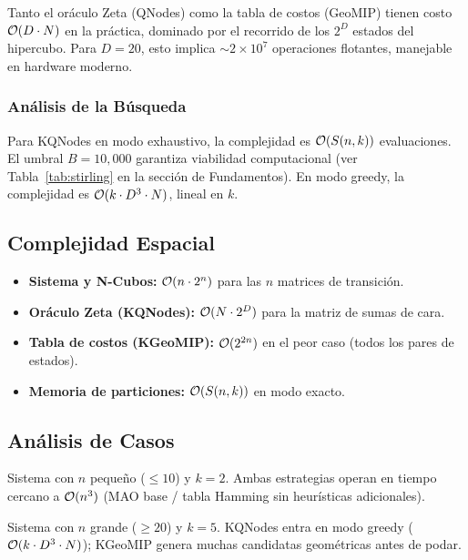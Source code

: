 Tanto el oráculo Zeta (QNodes) como la tabla de costos (GeoMIP) tienen costo $\mathcal{O}(D \cdot N)$ en la práctica, dominado por el recorrido de los $2^D$ estados del hipercubo. Para $D = 20$, esto implica $\sim 2\times10^7$ operaciones flotantes, manejable en hardware moderno.

\subsubsection{Análisis de la Búsqueda}

Para KQNodes en modo exhaustivo, la complejidad es $\mathcal{O}(S(n,k))$ evaluaciones. El umbral $B = 10{,}000$ garantiza viabilidad computacional (ver Tabla~\ref{tab:stirling} en la sección de Fundamentos). En modo greedy, la complejidad es $\mathcal{O}(k \cdot D^3 \cdot N)$, lineal en $k$.

\subsection{Complejidad Espacial}

\begin{itemize}[itemsep=4pt]
    \item \textbf{Sistema y N-Cubos:} $\mathcal{O}(n \cdot 2^n)$ para las $n$ matrices de transición.
    \item \textbf{Oráculo Zeta (KQNodes):} $\mathcal{O}(N \cdot 2^D)$ para la matriz de sumas de cara.
    \item \textbf{Tabla de costos (KGeoMIP):} $\mathcal{O}(2^{2n})$ en el peor caso (todos los pares de estados).
    \item \textbf{Memoria de particiones:} $\mathcal{O}(S(n,k))$ en modo exacto.
\end{itemize}

\subsection{Análisis de Casos}

\begin{description}[leftmargin=0pt, style=nextline]
    \item[\textbf{Mejor caso:}] Sistema con $n$ pequeño ($\leq 10$) y $k = 2$. Ambas estrategias operan en tiempo cercano a $\mathcal{O}(n^3)$ (MAO base / tabla Hamming sin heurísticas adicionales).

    \item[\textbf{Peor caso:}] Sistema con $n$ grande ($\geq 20$) y $k = 5$. KQNodes entra en modo greedy ($\mathcal{O}(k \cdot D^3 \cdot N)$); KGeoMIP genera muchas candidatas geométricas antes de podar.
\end{description}

